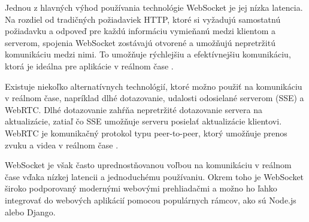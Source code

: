 Jednou z hlavných výhod používania technológie WebSocket je jej nízka latencia. Na rozdiel od tradičných požiadaviek HTTP, ktoré si vyžadujú samostatnú požiadavku a odpoveď pre každú informáciu vymieňanú medzi klientom a serverom, spojenia WebSocket zostávajú otvorené a umožňujú nepretržitú komunikáciu medzi nimi. To umožňuje rýchlejšiu a efektívnejšiu komunikáciu, ktorá je ideálna pre aplikácie v reálnom čase \citep{Guan2019}.

Existuje niekoľko alternatívnych technológií, ktoré možno použiť na komunikáciu v reálnom čase, napríklad dlhé dotazovanie, udalosti odosielané serverom (SSE) a WebRTC. Dlhé dotazovanie zahŕňa nepretržité dotazovanie servera na aktualizácie, zatiaľ čo SSE umožňuje serveru posielať aktualizácie klientovi. WebRTC je komunikačný protokol typu peer-to-peer, ktorý umožňuje prenos zvuku a videa v reálnom čase \citep{Guan2019}.

WebSocket je však často uprednostňovanou voľbou na komunikáciu v reálnom čase vďaka nízkej latencii a jednoduchému používaniu. Okrem toho je WebSocket široko podporovaný modernými webovými prehliadačmi a možno ho ľahko integrovať do webových aplikácií pomocou populárnych rámcov, ako sú Node.js alebo Django.






